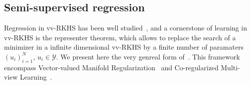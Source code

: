 \subsection{Semi-supervised regression}
Regression in \acl{vv-RKHS} has been well studied~\citep{Alvarez2012, Minh_icml13,minh2016unifying,sangnier2016joint,kadri2015operator,Micchelli2005,Brouard2016_jmlr}, and a cornerstone of learning in \acs{vv-RKHS} is the representer theorem, which allows to replace the search of a minimizer in a infinite dimensional \acs{vv-RKHS} by a finite number of paramaters $(u_i)_{i=1}^N$, $u_i\in\mathcal{Y}$. We present here the very genreal form of~\citet{minh2016unifying}. This framework encompass Vector-valued Manifold Regularization~\citep{belkin2006manifold,Brouard2011,minh2013unifying} and Co-regularized Multi-view Learning~\citep{brefeld2006efficient,sindhwani2008rkhs,rosenberg2009kernel,sun2011multi}.
